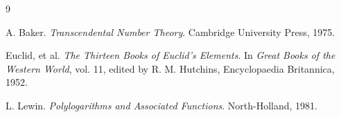 \documentclass{amsart}
\theoremstyle{plain}
\theoremstyle{definition}
\theoremstyle{remark}
\begin{document}
\begin{thebibliography}{9}

A. Baker. \textit{Transcendental Number Theory}. Cambridge University Press, 1975.

Euclid, et al. \textit{The Thirteen Books of Euclid's Elements}. In \textit{Great Books of the Western World}, vol. 11, edited by R. M. Hutchins, Encyclopaedia Britannica, 1952.

L. Lewin. \textit{Polylogarithms and Associated Functions}. North-Holland, 1981.

\end{thebibliography}
\end{document}
